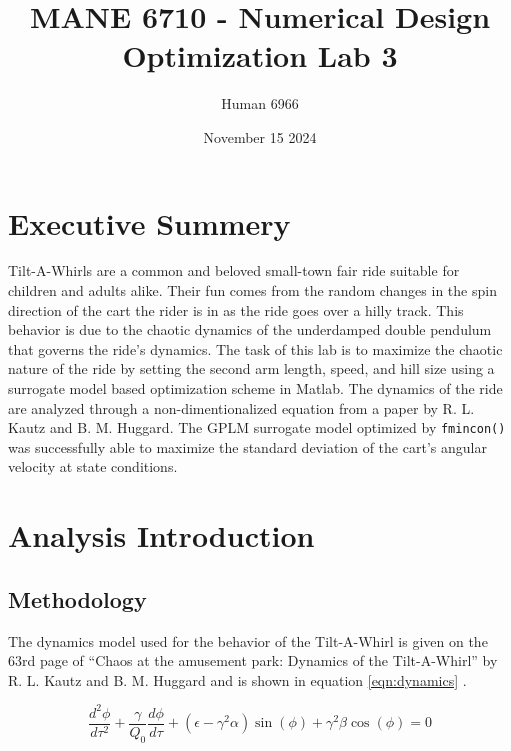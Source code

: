 \documentclass[11pt]{article}%
\title{MANE 6710 - Numerical Design Optimization Lab 3}
\author{Human 6966}
\date{November 15 2024}
\begin{document}
\maketitle
\newpage
\tableofcontents
\newpage
{}
\section*{Executive Summery}
\label{sec:abstract}

Tilt-A-Whirls are a common and beloved small-town fair ride suitable for children and adults alike. Their fun comes from the random changes in the spin direction of the cart the rider is in as the ride goes over a hilly track. This behavior is due to the chaotic dynamics of the underdamped double pendulum that governs the ride's dynamics. The task of this lab is to maximize the chaotic nature of the ride by setting the second arm length, speed, and hill size using a surrogate model based optimization scheme in Matlab. The dynamics of the ride are analyzed through a non-dimentionalized equation from a paper by R. L. Kautz and B. M. Huggard. The GPLM surrogate model optimized by \lstinline{fmincon()} was successfully  able to maximize the standard deviation of the cart's angular velocity at state conditions.

\section{Analysis Introduction}
\label{sec:intro}

\subsection {Methodology}
\label{sec:analysismethod}

The dynamics model used for the behavior of the Tilt-A-Whirl is given on the 63rd page of “Chaos at the amusement park: Dynamics of the Tilt-A-Whirl” by R. L. Kautz and B. M. Huggard and is shown in equation \ref{eqn:dynamics} \cite{dynamics}.

\begin{equation}
\label{eqn:dynamics}
\frac{d^{2}\phi}{d\tau^{2}}+\frac{\gamma}{Q_{0}}\frac{d\phi}{d\tau}+(\epsilon-\gamma^{2}\alpha)\sin(\phi)+\gamma^{2}\beta\cos(\phi)=0
\end{equation}
\end{document}
